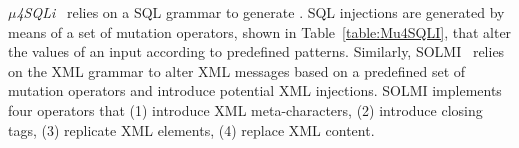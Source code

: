 






\emph{$\mu$4SQLi}~\cite{Appelt:SQLI:ISSTA:2014} relies on a SQL grammar to generate . 
SQL injections are generated by means of a set of mutation operators, shown in Table~\ref{table:Mu4SQLI}, that alter the values of an input according to predefined patterns.
Similarly, SOLMI~\cite{Jan:ISSTA:2016} relies on the XML grammar to alter XML messages based on a predefined set of mutation operators and introduce potential XML injections. 
SOLMI implements four operators that (1) introduce XML meta-characters, (2) introduce closing tags, (3) replicate XML elements, (4) replace XML content.


